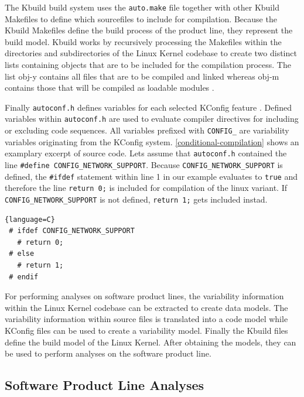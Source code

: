 \documentclass[a4paper]{article}
\begin{document}
The Kbuild build system uses the \texttt{auto.make} file together with other Kbuild Makefiles to define which sourcefiles to include for compilation. Because the Kbuild Makefiles define the build process of the product line, they represent the build model. Kbuild works by recursively processing the Makefiles within the directories and subdirectories of the Linux Kernel codebase to create two distinct lists containing objects that are to be included for the compilation process. The list obj-y contains all files that are to be compiled and linked whereas  obj-m contains those that will be compiled as loadable modules \cite{nadi-linux-kernel}\cite{makefiles.txt}. 

Finally \texttt{autoconf.h} defines variables for each selected KConfig feature \cite{Tartler:2011:FCC:1966445.1966451}. Defined variables within \texttt{autoconf.h} are used to evaluate compiler directives for including or excluding code sequences. All variables prefixed with \texttt{CONFIG\_} are variability variables originating from the KConfig system. \autoref{conditional-compilation} shows an examplary excerpt of source code. Lets assume that \texttt{autoconf.h} contained the line \texttt{\#define CONFIG\_\-NETWORK\_\-SUPPORT}. Because \texttt{CONFIG\_\-NETWORK\_\-SUPPORT} is defined, the \texttt{\#ifdef} statement within line 1 in our example evaluates to \texttt{true} and therefore the line \texttt{return 0;} is included for compilation of the  linux variant. If \texttt{CONFIG\_\-NETWORK\_\-SUPPORT} is not defined, \texttt{return 1;} gets included instad.

\begin{lstlisting}[caption=Conditional Compilation within the Linux Kernel, label=conditional-compilation]{language=C}
 # ifdef CONFIG_NETWORK_SUPPORT
   # return 0;
 # else 
   # return 1;
 # endif
\end{lstlisting}

For performing analyses on software product lines, the variability information within the Linux Kernel codebase can be extracted to create data models. The variability information within source files is translated into a code model while KConfig files can be used to create a variability model. Finally the Kbuild files define the build model of the Linux Kernel. After obtaining the models, they can be used to perform analyses on the software product line.

\subsection{Software Product Line Analyses}
\end{document}
